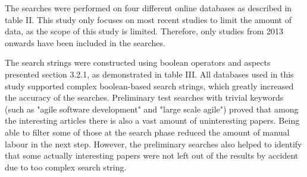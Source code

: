 The searches were performed on four different online databases as
described in table II. This study only focuses on most recent studies to limit
the amount of data, as the scope of this study is limited. Therefore, only
studies from 2013 onwards have been included in the searches.


\vspace{1.5cm}

The search strings were constructed using boolean operators and aspects
presented section 3.2.1, as demonstrated in table III. All databases
used in this study supported complex boolean-based search strings,
which greatly increased the accuracy of the searches. Preliminary test
searches with trivial keywords (such as "agile software development" and
"large scale agile") proved that among the interesting articles there is
also a vast amount of uninteresting papers. Being able to filter some
of those at the search phase reduced the amount of manual labour in the
next step. However, the preliminary searches also helped to identify
that some actually interesting papers were not left out of the results
by accident due to too complex search string.


